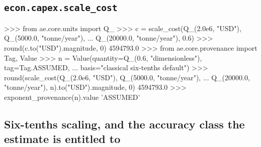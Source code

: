 \documentclass[10pt,a4paper,twoside]{report}
\begin{document}
\subsection*{\texttt{econ.capex.scale\_cost}}

\begin{doctestblock}
>>> from ae.core.units import Q_
>>> c = scale_cost(Q_(2.0e6, "USD"), Q_(5000.0, "tonne/year"),
...                Q_(20000.0, "tonne/year"), 0.6)
>>> round(c.to("USD").magnitude, 0)
4594793.0
>>> from ae.core.provenance import Tag, Value
>>> n = Value(quantity=Q_(0.6, "dimensionless"), tag=Tag.ASSUMED,
...           basis="classical six-tenths default")
>>> round(scale_cost(Q_(2.0e6, "USD"), Q_(5000.0, "tonne/year"),
...                  Q_(20000.0, "tonne/year"), n).to("USD").magnitude, 0)
4594793.0
>>> exponent_provenance(n).value
'ASSUMED'
\end{doctestblock}

\subsection*{Six-tenths scaling, and the accuracy class the estimate is entitled to}
\end{document}
